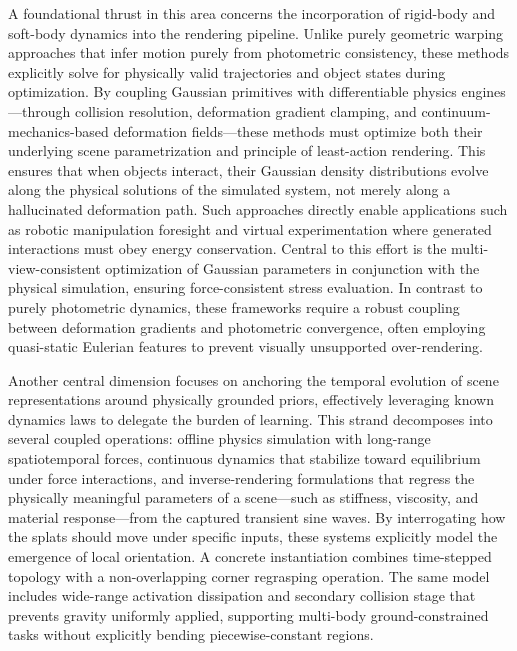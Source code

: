 \documentclass[11pt,a4paper]{article}
\begin{document}
A foundational thrust in this area concerns the incorporation of rigid-body and soft-body dynamics into the rendering pipeline. Unlike purely geometric warping approaches that infer motion purely from photometric consistency, these methods explicitly solve for physically valid trajectories and object states during optimization. By coupling Gaussian primitives with differentiable physics engines---through collision resolution, deformation gradient clamping, and continuum-mechanics-based deformation fields---these methods must optimize both their underlying scene parametrization and principle of least-action rendering. This ensures that when objects interact, their Gaussian density distributions evolve along the physical solutions of the simulated system, not merely along a hallucinated deformation path. Such approaches directly enable applications such as robotic manipulation foresight and virtual experimentation where generated interactions must obey energy conservation. Central to this effort is the multi-view-consistent optimization of Gaussian parameters in conjunction with the physical simulation, ensuring force-consistent stress evaluation. In contrast to purely photometric dynamics, these frameworks require a robust coupling between deformation gradients and photometric convergence, often employing quasi-static Eulerian features to prevent visually unsupported over-rendering.

Another central dimension focuses on anchoring the temporal evolution of scene representations around physically grounded priors, effectively leveraging known dynamics laws to delegate the burden of learning. This strand decomposes into several coupled operations: offline physics simulation with long-range spatiotemporal forces, continuous dynamics that stabilize toward equilibrium under force interactions, and inverse-rendering formulations that regress the physically meaningful parameters of a scene---such as stiffness, viscosity, and material response---from the captured transient sine waves. By interrogating how the splats should move under specific inputs, these systems explicitly model the emergence of local orientation. A concrete instantiation combines time-stepped topology with a non-overlapping corner regrasping operation. The same model includes wide-range activation dissipation and secondary collision stage that prevents gravity uniformly applied, supporting multi-body ground-constrained tasks without explicitly bending piecewise-constant regions.
\end{document}
